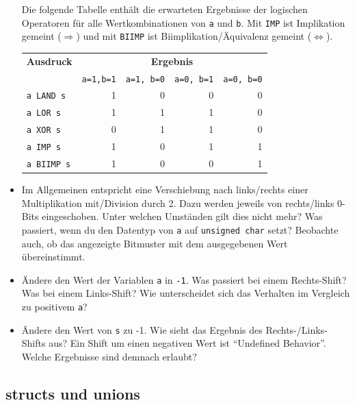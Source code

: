 \begin{itemize}
Die folgende Tabelle enthält die erwarteten Ergebnisse der logischen Operatoren für alle Wertkombinationen von \lstinline|a| und \lstinline|b|.
Mit \texttt{IMP} ist Implikation gemeint ($\Rightarrow$) und mit \texttt{BIIMP} ist Biimplikation/Äquivalenz gemeint ($\Leftrightarrow$).\\[1ex]
\begin{center}
\begin{tabular}{lrrrr}
    \toprule
    \textbf{Ausdruck} & \multicolumn{4}{c}{\textbf{Ergebnis}}\\
    & \lstinline|a=1,b=1| & \lstinline|a=1, b=0| & \lstinline|a=0, b=1| & \lstinline|a=0, b=0|\\
    \midrule
    \texttt{a LAND s}  & 1  & 0& 0& 0\\
    \texttt{a LOR s}   & 1  & 1& 1& 0\\
    \texttt{a XOR s}   & 0  & 1& 1& 0\\
    \texttt{a IMP s}   & 1  & 0& 1& 1\\
    \texttt{a BIIMP s} & 1  & 0& 0& 1\\
    \bottomrule
\end{tabular}
\end{center}
\item 
Im Allgemeinen entspricht eine Verschiebung nach links/rechts einer Multiplikation mit/Division durch 2.
Dazu werden jeweils von rechts/links 0-Bits eingeschoben.
Unter welchen Umständen gilt dies nicht mehr?
Was passiert, wenn du den Datentyp von \lstinline|a| auf \lstinline|unsigned char| setzt?
Beobachte auch, ob das angezeigte Bitmuster mit dem ausgegebenen Wert übereinstimmt.
\item 
Ändere den Wert der Variablen \lstinline|a| in \lstinline|-1|.
Was passiert bei einem Rechts-Shift?
Was bei einem Links-Shift?
Wie unterscheidet sich das Verhalten im Vergleich zu positivem \lstinline|a|?
\item 
Ändere den Wert von \lstinline|s| zu -1.
Wie sieht das Ergebnis des Rechts-/Links-Shifts aus?
Ein Shift um einen negativen Wert ist \enquote{Undefined Behavior}.
Welche Ergebnisse sind demnach erlaubt?
\end{itemize}

\subsection{structs und unions \optional}

